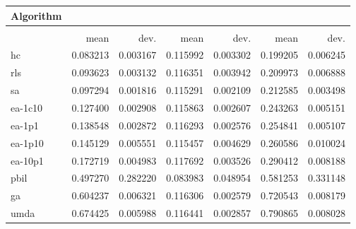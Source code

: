 \begin{tabular}{@{} l *{6}{>{{}}N{1}{2}} @{}}
\toprule
{Algorithm} &  \\
\midrule
&  &  &  \\
\midrule
& {mean} & {dev.} & {mean} & {dev.} & {mean} & {dev.} \\
\midrule
hc & 0.083213 & 0.003167 & 0.115992 & 0.003302 & 0.199205 & 0.006245 \\
rls & 0.093623 & 0.003132 & 0.116351 & 0.003942 & 0.209973 & 0.006888 \\
sa & 0.097294 & 0.001816 & 0.115291 & 0.002109 & 0.212585 & 0.003498 \\
ea-1c10 & 0.127400 & 0.002908 & 0.115863 & 0.002607 & 0.243263 & 0.005151 \\
ea-1p1 & 0.138548 & 0.002872 & 0.116293 & 0.002576 & 0.254841 & 0.005107 \\
ea-1p10 & 0.145129 & 0.005551 & 0.115457 & 0.004629 & 0.260586 & 0.010024 \\
ea-10p1 & 0.172719 & 0.004983 & 0.117692 & 0.003526 & 0.290412 & 0.008188 \\
pbil & 0.497270 & 0.282220 & 0.083983 & 0.048954 & 0.581253 & 0.331148 \\
ga & 0.604237 & 0.006321 & 0.116306 & 0.002579 & 0.720543 & 0.008179 \\
umda & 0.674425 & 0.005988 & 0.116441 & 0.002857 & 0.790865 & 0.008028 \\
\bottomrule
\end{tabular}
